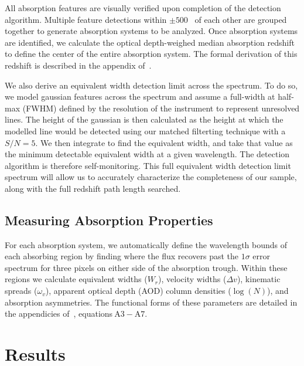 \documentclass[iop,apj,numberedappendix,appendixfloats,twocolappendix]{emulateapj}
\begin{document}
All absorption features are visually verified upon completion of the detection algorithm. Multiple feature detections within $\pm 500$~{\kms} of each other are grouped together to generate absorption systems to be analyzed. Once absorption systems are identified, we calculate the optical depth-weighed median absorption redshift to define the center of the entire absorption system. The formal derivation of this redshift is described in the appendix of~\cite{Churchill2001}.

We also derive an equivalent width detection limit across the spectrum. To do so, we model gaussian features across the spectrum and assume a full-width at half-max (FWHM) defined by the resolution of the instrument to represent unresolved lines. The height of the gaussian is then calculated as the height at which the modelled line would be detected using our matched filterting technique with a $S/N = 5$. We then integrate to find the equivalent width, and take that value as the minimum detectable equivalent width at a given wavelength. The detection algorithm is therefore self-monitoring. This full equivalent width detection limit spectrum will allow us to accurately characterize the completeness of our sample, along with the full redshift path length searched. 


\subsection{Measuring Absorption Properties}
\label{sec:measuring}

For each absorption system, we automatically define the wavelength bounds of each absorbing region by finding where the flux recovers past the $1\sigma$ error spectrum for three pixels on either side of the absorption trough. Within these regions we calculate equivalent widths ($W_r$), velocity widths ($\Delta v$), kinematic spreads ($\omega_v$), apparent optical depth (AOD) column densities ($\log(N)$), and absorption asymmetries. The functional forms of these parameters are detailed in the appendicies of~\cite{Churchill2001}, equations$~\mathrm{A3 - A7}$.



\section{Results}
\label{sec:results}
\end{document}

